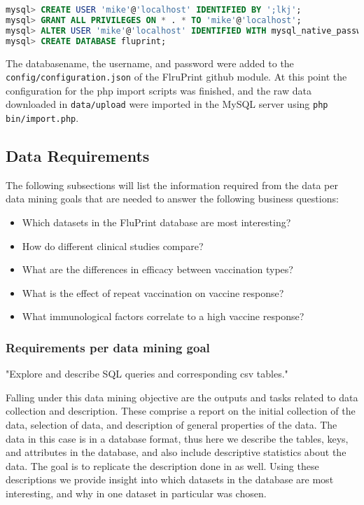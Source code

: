 \begin{lstlisting}[language=sql, caption=Adding user and database to sql server, label={lst:addUser}]
mysql> CREATE USER 'mike'@'localhost' IDENTIFIED BY ';lkj';
mysql> GRANT ALL PRIVILEGES ON * . * TO 'mike'@'localhost';
mysql> ALTER USER 'mike'@'localhost' IDENTIFIED WITH mysql_native_password BY 'mike';
mysql> CREATE DATABASE fluprint;
\end{lstlisting}

The databasename, the username, and password were added to the
\lstinline{config/configuration.json} of the FlruPrint github module. At this
point the configuration for the php import scripts was finished, and the raw
data downloaded in \lstinline{data/upload} were imported in the MySQL server
using \lstinline{php bin/import.php}.

\subsection{Data Requirements}

The following subsections will list the information required from the data per
data mining goals that are needed to answer the following business questions:

\begin{itemize}
        \item Which datasets in the FluPrint database are most interesting?
        \item How do different clinical studies compare?
        \item What are the differences in efficacy between vaccination types?
        \item What is the effect of repeat vaccination on vaccine response?
        \item What immunological factors correlate to a high vaccine response?
\end{itemize}

\subsubsection{Requirements per data mining goal}

\begin{displayquote}
"Explore and describe SQL queries and corresponding csv tables."
\end{displayquote}

Falling under this data mining objective are the outputs and tasks related to
data collection and description. These comprise a report on the initial
collection of the data, selection of data, and description of general
properties of the data. The data in this case is in a database format, thus
here we describe the tables, keys, and attributes in the database, and also
include descriptive statistics about the data. The goal is to replicate the
description done in \cite{tomicFluPRINTDatasetMultidimensional2019} as well.
Using these descriptions we provide insight into which datasets in the database
are most interesting, and why in \cite{tomicSIMONAutomatedMachine2019} one
dataset in particular was chosen.

